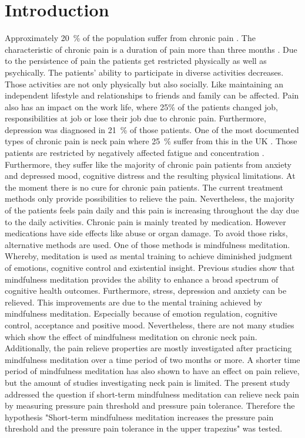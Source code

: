 \section{Introduction}
Approximately 20~\% of the population suffer from chronic pain \cite{Macfarlanea2016}. The characteristic of chronic pain is a duration of pain more than three months \cite{Mello2016}. Due to the persistence of pain the patients get restricted physically as well as psychically. The patients’ ability to participate in diverse activities decreases. Those activities are not only physically but also socially. Like maintaining an independent lifestyle and relationships to friends and family can be affected.  Pain also has an impact on the work life, where 25\% of the patients changed job, responsibilities at job or lose their job due to chronic pain. Furthermore, depression was diagnosed in 21~\% of those patients. \cite{Breivik2006}
One of the most documented types of chronic pain is neck pain where  25~\% suffer from this in the UK \cite{Macfarlanea2016}. Those patients are restricted by negatively affected fatigue and concentration \cite{Zee2016}. Furthermore, they suffer like the majority of chronic pain patients from anxiety and depressed mood, cognitive distress and the resulting physical limitations. \cite{Gross2013}
At the moment there is no cure for chronic pain patients. The current treatment methods only provide possibilities to relieve the pain. \cite{Pope2017,Dawn2009} Nevertheless, the majority of the patients feels pain daily and this pain is increasing throughout the day due to the daily activities. \cite{Breivik2006} Chronic pain is mainly treated by medication. However medications have side effects like abuse or organ damage. To avoid those risks, alternative methods are used. One of those methods is mindfulness meditation. Whereby, meditation is used as mental training to achieve diminished judgment of emotions, cognitive control and existential insight. \cite{Dawn2009}
Previous studies show that mindfulness meditation provides the ability to enhance a broad spectrum of cognitive health outcomes. Furthermore, stress, depression and anxiety can be relieved. This improvements are due to the mental training achieved by mindfulness meditation. Especially because of emotion regulation, cognitive control, acceptance and positive mood. \cite{Dawn2009,Zeidan2012} Nevertheless, there are not many studies which show the effect of mindfulness meditation on chronic neck pain. \cite{Macfarlanea2016} Additionally, the pain relieve properties are mostly investigated after practicing mindfulness meditation over a time period of two months or more.  A shorter time period of mindfulness meditation has also shown to have an effect on pain relieve, but the amount of studies investigating neck pain is limited.
The present study addressed the question if short-term mindfulness meditation can relieve neck pain by measuring pressure pain threshold and pressure pain tolerance. Therefore the hypothesis "Short-term mindfulness meditation increases the pressure pain threshold and the pressure pain tolerance in the upper trapezius" was tested.
